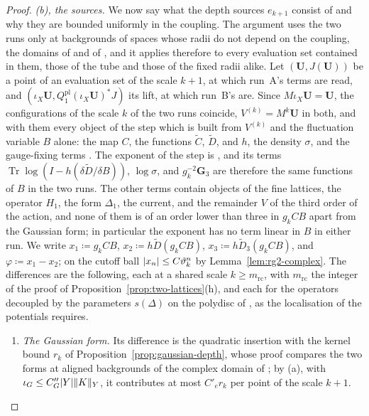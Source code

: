 \documentclass[11pt]{preprint}
\newcommand{\Tr}{\operatorname{Tr}}
\DeclarePairedDelimiter{\abs}{\lvert}{\rvert}
\DeclarePairedDelimiter{\norm}{\lVert}{\rVert}
\numberwithin{equation}{section}
\theoremstyle{definition}
\theoremstyle{remark}
\theoremstyle{plain}
\begin{document}
\begin{proof}
\emph{(b), the sources.} We now say what the depth sources $e_{k+1}$ consist of and why they are bounded uniformly in the coupling. The argument uses the two runs only at backgrounds of spaces whose radii do not depend on the coupling, the domains of \cite[(3.37), p.~396]{BalabanPBG} and of \cite[Proposition~3, p.~36]{BalabanAVG}, and it applies therefore to every evaluation set contained in them, those of the tube and those of the fixed radii alike. Let $(\mathbf U, J(\mathbf U))$ be a point of an evaluation set of the scale $k + 1$, at which run~A's terms are read, and $(\iota_X\mathbf U, Q^{\mathrm{pl}}_1(\iota_X\mathbf U)^*J)$ its lift, at which run~B's are. Since $M\iota_X\mathbf U = \mathbf U$, the configurations of the scale $k$ of the two runs coincide, $V^{(k)} = M^k\mathbf U$ in both, and with them every object of the step which is built from $V^{(k)}$ and the fluctuation variable $B$ alone: the map $C$, the functions $\tilde C$, $\tilde D$, and $h$, the density $\sigma$, and the gauge-fixing terms \cite[pp.~266--268]{BalabanRG1}. The exponent of the step is \cite[(2.12), p.~268]{BalabanRG1}, and its terms $\Tr\log(I - h(\delta\tilde D/\delta B))$, $\log\sigma$, and $g_k^{-2}\mathbf G_3$ are therefore the same functions of $B$ in the two runs. The other terms contain objects of the fine lattices, the operator $H_1$, the form $\Delta_1$, the current, and the remainder $V$ of the third order of the action, and none of them is of an order lower than three in $g_kCB$ apart from the Gaussian form; in particular the exponent has no term linear in $B$ in either run. We write $x_1 \coloneqq g_kCB$, $x_2 \coloneqq h\tilde D(g_kCB)$, $x_3 \coloneqq h\tilde D_3(g_kCB)$, and $\varphi \coloneqq x_1 - x_2$; on the cutoff ball $\abs{x_n} \leq C\vartheta_k^n$ by Lemma~\ref{lem:rg2-complex}. The differences are the following, each at a shared scale $k \geq m_{\mathrm{rc}}$, with $m_{\mathrm{rc}}$ the integer of the proof of Proposition~\ref{prop:two-lattices}(h), and each for the operators decoupled by the parameters $s(\Delta)$ on the polydisc of \cite[(1.23), p.~7]{BalabanRG2}, as the localisation of the potentials requires.
\begin{enumerate}[label=(\arabic*)]
\item \emph{The Gaussian form.} Its difference is the quadratic insertion with the kernel bound $r_k$ of Proposition~\ref{prop:gaussian-depth}, whose proof compares the two forms at aligned backgrounds of the complex domain of \cite{BalabanPBG}; by (a), with $\iota_G \leq C''_G\abs Y\norm K_Y$, it contributes at most $C'_er_k$ per point of the scale $k + 1$.

\end{enumerate}
\end{proof}
\end{document}
